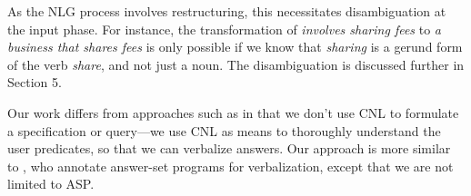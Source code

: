 \documentclass[11pt]{article}
\newcommand{\todoregina}[2][]{\todo[color=red!40,#1]{Regina: #2}}
\def\scasp{s(CASP) }
\begin{document}
As the NLG process involves restructuring, this necessitates disambiguation at the input phase. For instance, the transformation of \textit{involves sharing fees} to \textit{a business that shares fees} is only possible if we know that \textit{sharing} is a gerund form of the verb \textit{share}, and not just a noun.
The disambiguation is discussed further in Section 5.    

Our work differs from approaches such as \citet{schwitter2012answer} in that we don't use CNL to formulate a specification or query---we use CNL as means to thoroughly understand the user predicates, so that we can verbalize answers. Our approach is more similar to \citet{devos2012annotating}, who annotate answer-set programs for verbalization, except that we are not limited to ASP.




\end{document}
